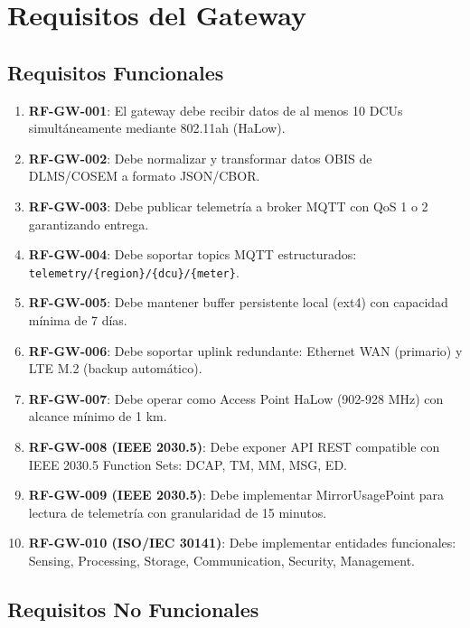 \section{Requisitos del Gateway}

\subsection{Requisitos Funcionales}

\begin{enumerate}
    \item \textbf{RF-GW-001}: El gateway debe recibir datos de al menos 10 DCUs simultáneamente mediante 802.11ah (HaLow).
    \item \textbf{RF-GW-002}: Debe normalizar y transformar datos OBIS de DLMS/COSEM a formato JSON/CBOR.
    \item \textbf{RF-GW-003}: Debe publicar telemetría a broker MQTT con QoS 1 o 2 garantizando entrega.
    \item \textbf{RF-GW-004}: Debe soportar topics MQTT estructurados: \texttt{telemetry/\{region\}/\{dcu\}/\{meter\}}.
    \item \textbf{RF-GW-005}: Debe mantener buffer persistente local (ext4) con capacidad mínima de 7 días.
    \item \textbf{RF-GW-006}: Debe soportar uplink redundante: Ethernet WAN (primario) y LTE M.2 (backup automático).
    \item \textbf{RF-GW-007}: Debe operar como Access Point HaLow (902-928 MHz) con alcance mínimo de 1 km.
    \item \textbf{RF-GW-008 (IEEE 2030.5)}: Debe exponer API REST compatible con IEEE 2030.5 Function Sets: DCAP, TM, MM, MSG, ED.
    \item \textbf{RF-GW-009 (IEEE 2030.5)}: Debe implementar MirrorUsagePoint para lectura de telemetría con granularidad de 15 minutos.
    \item \textbf{RF-GW-010 (ISO/IEC 30141)}: Debe implementar entidades funcionales: Sensing, Processing, Storage, Communication, Security, Management.
\end{enumerate}

\subsection{Requisitos No Funcionales}

